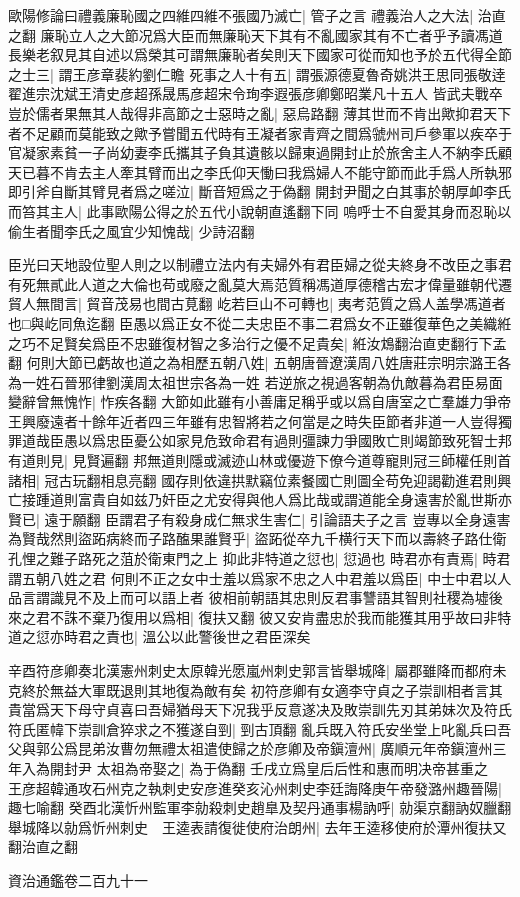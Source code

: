 歐陽修論曰禮義廉恥國之四維四維不張國乃滅亡|{
	管子之言}
禮義治人之大法|{
	治直之翻}
廉恥立人之大節况爲大臣而無廉恥天下其有不亂國家其有不亡者乎予讀馮道長樂老叙見其自述以爲榮其可謂無廉恥者矣則天下國家可從而知也予於五代得全節之士三|{
	謂王彦章裴約劉仁瞻}
死事之人十有五|{
	謂張源德夏魯奇姚洪王思同張敬逹翟進宗沈斌王清史彦超孫晟馬彦超宋令珣李遐張彦卿鄭昭業凡十五人}
皆武夫戰卒豈於儒者果無其人哉得非高節之士惡時之亂|{
	惡烏路翻}
薄其世而不肯出歟抑君天下者不足顧而莫能致之歟予嘗聞五代時有王凝者家青齊之間爲虢州司戶參軍以疾卒于官凝家素貧一子尚幼妻李氏攜其子負其遺骸以歸東過開封止於旅舍主人不納李氏顧天已暮不肯去主人牽其臂而出之李氏仰天慟曰我爲婦人不能守節而此手爲人所執邪即引斧自斷其臂見者爲之嗟泣|{
	斷音短爲之于偽翻}
開封尹聞之白其事於朝厚卹李氏而笞其主人|{
	此事歐陽公得之於五代小說朝直遙翻下同}
嗚呼士不自愛其身而忍恥以偷生者聞李氏之風宜少知愧哉|{
	少詩沼翻}


臣光曰天地設位聖人則之以制禮立法内有夫婦外有君臣婦之從夫終身不改臣之事君有死無貳此人道之大倫也苟或廢之亂莫大焉范質稱馮道厚德稽古宏才偉量雖朝代遷貿人無間言|{
	貿音茂易也間古莧翻}
屹若巨山不可轉也|{
	夷考范質之爲人盖學馮道者也□與屹同魚迄翻}
臣愚以爲正女不從二夫忠臣不事二君爲女不正雖復華色之美織絍之巧不足賢矣爲臣不忠雖復材智之多治行之優不足貴矣|{
	絍汝鴆翻治直吏翻行下孟翻}
何則大節已虧故也道之為相歷五朝八姓|{
	五朝唐晉遼漢周八姓唐莊宗明宗潞王各為一姓石晉邪律劉漢周太祖世宗各為一姓}
若逆旅之視過客朝為仇敵暮為君臣易面變辭曾無愧怍|{
	怍疾各翻}
大節如此雖有小善庸足稱乎或以爲自唐室之亡羣雄力爭帝王興廢遠者十餘年近者四三年雖有忠智將若之何當是之時失臣節者非道一人豈得獨罪道哉臣愚以爲忠臣憂公如家見危致命君有過則彊諫力爭國敗亡則竭節致死智士邦有道則見|{
	見賢遍翻}
邦無道則隱或滅迹山林或優遊下僚今道尊寵則冠三師權任則首諸相|{
	冠古玩翻相息亮翻}
國存則依違拱默竊位素餐國亡則圖全苟免迎謁勸進君則興亡接踵道則富貴自如兹乃奸臣之尤安得與他人爲比哉或謂道能全身遠害於亂世斯亦賢已|{
	遠于願翻}
臣謂君子有殺身成仁無求生害仁|{
	引論語夫子之言}
豈專以全身遠害為賢哉然則盜跖病終而子路醢果誰賢乎|{
	盜跖從卒九千横行天下而以壽終子路仕衛孔悝之難子路死之菹於衛東門之上}
抑此非特道之愆也|{
	愆過也}
時君亦有責焉|{
	時君謂五朝八姓之君}
何則不正之女中士羞以爲家不忠之人中君羞以爲臣|{
	中士中君以人品言謂識見不及上而可以語上者}
彼相前朝語其忠則反君事讐語其智則社稷為墟後來之君不誅不棄乃復用以爲相|{
	復扶又翻}
彼又安肯盡忠於我而能獲其用乎故曰非特道之愆亦時君之責也|{
	溫公以此警後世之君臣深矣}


辛酉符彦卿奏北漢憲州刺史太原韓光愿嵐州刺史郭言皆舉城降|{
	屬郡雖降而都府未克終於無益大軍既退則其地復為敵有矣}
初符彦卿有女適李守貞之子崇訓相者言其貴當爲天下母守貞喜曰吾婦猶母天下况我乎反意遂决及敗崇訓先刃其弟妹次及符氏符氏匿幃下崇訓倉猝求之不獲遂自剄|{
	剄古頂翻}
亂兵既入符氏安坐堂上叱亂兵曰吾父與郭公爲昆弟汝曹勿無禮太祖遣使歸之於彦卿及帝鎭澶州|{
	廣順元年帝鎭澶州三年入為開封尹}
太祖為帝娶之|{
	為于偽翻}
壬戌立爲皇后后性和惠而明决帝甚重之　王彦超韓通攻石州克之執刺史安彦進癸亥沁州刺史李廷誨降庚午帝發潞州趣晉陽|{
	趣七喻翻}
癸酉北漢忻州監軍李勍殺刺史趙臯及契丹通事楊訥呼|{
	勍渠京翻訥奴臘翻}
舉城降以勍爲忻州刺史　王逵表請復徙使府治朗州|{
	去年王逵移使府於潭州復扶又翻治直之翻}


資治通鑑卷二百九十一
